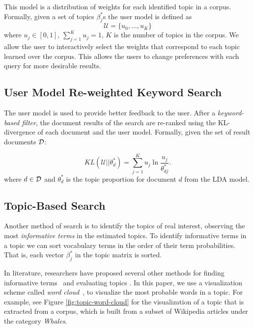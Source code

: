 This model is a distribution of weights for each identified topic in 
a corpus. Formally, given a set of topics $\beta_j^{*}$s the user 
model is defined as
$$
\mathcal{U} = \{u_0, \ldots, u_{K}\}
$$
where $u_j \in [0,1]$, $\sum_{j = 1}^K u_j = 1$, $K$ is the number 
of topics in the corpus.
We allow the user to interactively select the weights that correspond to
each topic learned over the corpus. This allows the users to change preferences with each query
for more desirable results.

\subsection{User Model Re-weighted Keyword Search}
The user model is used to provide better feedback to
the user. After a \textsl{keyword-based filter}, the document results of the search 
are re-ranked using the KL-divergence of each document and the
user model. Formally, given the set of result documents $\cal D$:

\begin{equation} \label{eq:KL}
KL(\mathcal{U}||\theta^*_{d}) = \sum_{j = 1}^K u_j \ln \frac{u_j}{\theta^*_{dj}}.
\end{equation}
where $d \in {\cal D}$ and $\theta^*_{d}$ is the topic proportion 
for document $d$ from the LDA model. 


\subsection{Topic-Based Search}

Another method of search is to identify the topics of 
real interest, observing the most \textsl{informative terms} in 
the estimated topics. 
To identify informative terms in a topic we can sort vocabulary 
terms in the order of their term probabilities.
That is, each vector $\beta_j^{*}$ in the topic matrix is sorted.
  
In literature, researchers have proposed several other methods for 
finding informative terms~\cite{2012-termite} and evaluating topics 
\cite{mimno2011optimizing}. In this paper, we use a visualization 
scheme called \textsl{word cloud}~\cite{Davis2013}, to visualize the 
most probable words in a topic. For example, see Figure 
\ref{fig:topic-word-cloud} for the visualization of a topic that is 
extracted from a corpus, which is built from a subset of Wikipedia 
articles under the category \textsl{Whales}. 
       
